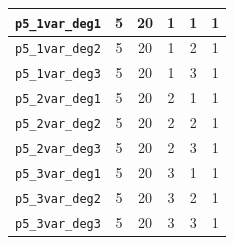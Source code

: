 \begin{table}[H]
{\begin{tabular}{lccccc}
\hline
\texttt{p5\_1var\_deg1} & 5 & 20 & 1 & 1 & 1 \\
\hline
\texttt{p5\_1var\_deg2} & 5 & 20 & 1 & 2 & 1 \\
\hline
\texttt{p5\_1var\_deg3} & 5 & 20 & 1 & 3 & 1 \\
\hline
\texttt{p5\_2var\_deg1} & 5 & 20 & 2 & 1 & 1 \\
\hline
\texttt{p5\_2var\_deg2} & 5 & 20 & 2 & 2 & 1 \\
\hline
\texttt{p5\_2var\_deg3} & 5 & 20 & 2 & 3 & 1 \\
\hline
\texttt{p5\_3var\_deg1} & 5 & 20 & 3 & 1 & 1 \\
\hline
\texttt{p5\_3var\_deg2} & 5 & 20 & 3 & 2 & 1 \\
\hline
\texttt{p5\_3var\_deg3} & 5 & 20 & 3 & 3 & 1 \\
\bottomrule
\end{tabular}
}%
\end{table}


